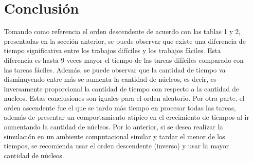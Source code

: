 \documentclass{article}
\begin{document}
\section{Conclusión}
Tomando como referencia el orden descendente de acuerdo con las tablas 1 y 2, presentadas en la sección anterior, se puede observar que existe una diferencia de tiempo significativa entre los trabajos difíciles y los trabajos fáciles. Esta diferencia es hasta 9 veces mayor el tiempo de las tareas difíciles comparado con las tareas fáciles. Además, se puede observar que la cantidad de tiempo va disminuyendo entre más se aumenta la cantidad de núcleos, es decir, es inversamente proporcional la cantidad de tiempo con respecto a la cantidad de nucleos. Estas conclusiones son iguales para el orden aleatorio. 
Por otra parte, el orden ascendente fue el que se tardo más tiempo en procesar todas las tareas, además de presentar un comportamiento atípico en el crecimiento de tiempos al ir aumentando la cantidad de núcleos. Por lo anterior, si se desea realizar la simulación en un ambiente computacional similar y tardar el menor de los tiempos, se recomienda usar el orden descendente (inverso) y usar la mayor cantidad de núcleos.



\end{document}
